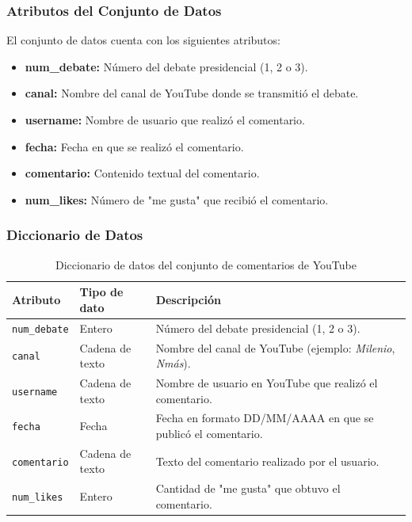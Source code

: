 \documentclass[10pt, a4paper]{article}
\begin{document}
    \subsubsection{Atributos del Conjunto de Datos}
    
    El conjunto de datos cuenta con los siguientes atributos:
    
    \begin{itemize}
    	\item \textbf{num\_debate:} Número del debate presidencial (1, 2 o 3).
    	\item \textbf{canal:} Nombre del canal de YouTube donde se transmitió el debate.
    	\item \textbf{username:} Nombre de usuario que realizó el comentario.
    	\item \textbf{fecha:} Fecha en que se realizó el comentario.
    	\item \textbf{comentario:} Contenido textual del comentario.
    	\item \textbf{num\_likes:} Número de "me gusta" que recibió el comentario.
    \end{itemize}
    
    \subsubsection{Diccionario de Datos}
    
    \begin{table}[h]
    	\centering
    	\begin{tabular}{llp{9cm}}
    		\hline
    		\textbf{Atributo} & \textbf{Tipo de dato} & \textbf{Descripción} \\
    		\hline
    		\texttt{num\_debate} & Entero & Número del debate presidencial (1, 2 o 3). \\
    		\texttt{canal} & Cadena de texto & Nombre del canal de YouTube (ejemplo: \textit{Milenio}, \textit{Nmás}). \\
    		\texttt{username} & Cadena de texto & Nombre de usuario en YouTube que realizó el comentario. \\
    		\texttt{fecha} & Fecha & Fecha en formato DD/MM/AAAA en que se publicó el comentario. \\
    		\texttt{comentario} & Cadena de texto & Texto del comentario realizado por el usuario. \\
    		\texttt{num\_likes} & Entero & Cantidad de "me gusta" que obtuvo el comentario. \\
    		\hline
    	\end{tabular}
    	\caption{Diccionario de datos del conjunto de comentarios de YouTube}
    \end{table}
    
\end{document}
